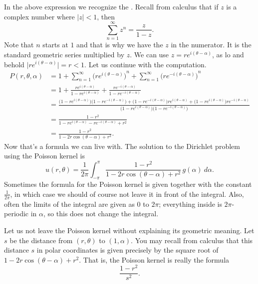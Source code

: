 \documentclass[12pt]{book}
\begin{document}
In the above expression we recognize the
\emph{}.
Recall from calculus that if $z$ is a complex number where $\lvert z \rvert < 1$, then
\begin{equation*}
\sum_{n=1}^\infty z^n = \frac{z}{1-z} .
\end{equation*}
Note that $n$ starts at $1$ and that is why we have the $z$ in the numerator.
It is the standard geometric series multiplied by $z$.
We can use $z = re^{i(\theta-\alpha)}$, as
lo and behold $\lvert re^{i(\theta-\alpha)} \rvert = r < 1$.
Let us
continue with the computation.
\begin{equation*}
\begin{split}
P(r,\theta,\alpha)
& =
1
+
\sum_{n=1}^\infty
{\bigl(
re^{i(\theta-\alpha)}\bigr)}^{n}
+
\sum_{n=1}^\infty
{\bigl(
re^{-i(\theta-\alpha)}\bigr)}^{n}
\\
& =
1
+
\frac{re^{i(\theta-\alpha)}}{1-re^{i(\theta-\alpha)}}
+
\frac{re^{-i(\theta-\alpha)}}{1-re^{-i(\theta-\alpha)}}
\\
& = 
\frac{
\bigl(1-re^{i(\theta-\alpha)}\bigr)\bigl(1-re^{-i(\theta-\alpha)}\bigr)
+
\bigl(1-re^{-i(\theta-\alpha)}\bigr)re^{i(\theta-\alpha)} +
\bigl(1-re^{i(\theta-\alpha)}\bigr)re^{-i(\theta-\alpha)}}
{\bigl(1-re^{i(\theta-\alpha)}\bigr)\bigl(1-re^{-i(\theta-\alpha)}\bigr)}
\\
& = 
\frac{1 -r^2}{1 - re^{i(\theta-\alpha)} - re^{-i(\theta-\alpha)} +r^2}
\\
& = 
\frac{1 -r^2}{1 - 2r\cos(\theta-\alpha) +r^2} .
\end{split}
\end{equation*}
Now that's a formula we can live with.  The
solution to the Dirichlet problem using the Poisson kernel is
\begin{equation*}
\boxed{~~
u(r,\theta) = 
\frac{1}{2\pi} \int_{-\pi}^{\pi}
\frac{1 -r^2}{1 - 2r\cos(\theta-\alpha) +r^2} \, g(\alpha) ~ d\alpha .
~~}
\end{equation*}
Sometimes the formula for the Poisson kernel is
given together with the constant $\frac{1}{2\pi}$, in which case we should
of course not leave it in front of the integral.
Also, often the limits
of the integral are given as 0 to $2\pi$; everything inside is
$2\pi$-periodic in $\alpha$, so this does not change the integral.

\begin{diffyfloatingfigurer}{2.1in}{2.4in}
\noindent
{}
\end{diffyfloatingfigurer}
Let us not leave the Poisson kernel without explaining its geometric
meaning.  Let $s$ be the distance from $(r,\theta)$ to
$(1,\alpha)$.
You may recall from calculus that
this distance $s$ in polar coordinates is given precisely by the square root
of $1 - 2r\cos(\theta-\alpha) +r^2$.  That is, the Poisson kernel is really
the formula
\begin{equation*}
\frac{1-r^2}{s^2} .
\end{equation*}
\end{document}
